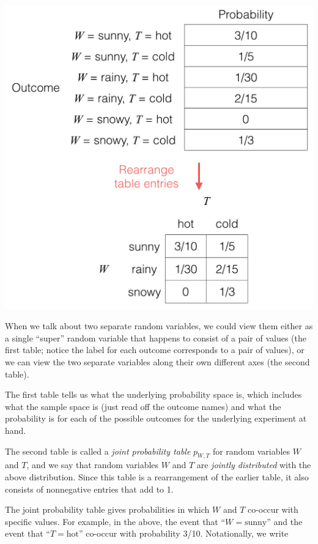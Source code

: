 \documentclass[6008notes.tex]{subfiles}
\begin{document}
{\centering\includegraphics[scale=0.4]{images_sec-joint-rv-rearrange-table} \par}

When we talk about two separate random variables, we could view them either as a single ``super'' random variable that happens to consist of a pair of values (the first table; notice the label for each outcome corresponds to a pair of values), or we can view the two separate variables along their own different axes (the second table).

The first table tells us what the underlying probability space is, which includes what the sample space is (just read off the outcome names) and what the probability is for each of the possible outcomes for the underlying experiment at hand.

The second table is called a \textit{joint probability table} $p_{W,T}$ for random variables $W$ and $T$, and we say that random variables $W$ and $T$ are \textit{jointly distributed} with the above distribution. Since this table is a rearrangement of the earlier table, it also consists of nonnegative entries that add to 1.

The joint probability table gives probabilities in which $W$ and $T$ co-occur with specific values. For example, in the above, the event that ``$W=\text {sunny}$'' and the event that ``$T=\text {hot}$'' co-occur with probability 3/10. Notationally, we write
\end{document}
